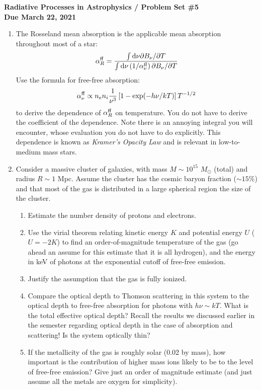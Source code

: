 \documentclass[11pt, preprint]{article}
\begin{document}
\begin{center}
  {\bf Radiative Processes in Astrophysics / Problem Set \#5 \\
    Due March 22, 2021}
\end{center}

\begin{enumerate}
\item 
  The Rosseland mean absorption is the applicable mean absorption
  throughout most of a star:
  \begin{equation}
    \alpha_R^{\rm ff} = \frac{\int {\rm d}\nu \partial B_\nu /
      \partial T}
    {\int {\rm d}\nu \left(1/\alpha_\nu^{\rm ff}\right) \partial B_\nu / \partial T}
  \end{equation}
  Use the formula for free-free absorption:
  \begin{equation}
    \alpha_\nu^{\rm ff} \propto n_e n_i \frac{1}{\nu^3} \left[1 -
      \exp(-h\nu/ kT)\right] T^{-1/2}
  \end{equation}
  to derive the dependence of $\alpha_R^{\rm ff}$ on temperature. You
  do not have to derive the coefficient of the dependence. Note there
  is an annoying integral you will encounter, whose evaluation you do
  not have to do explicitly. This dependence is known as {\it Kramer's
    Opacity Law} and is relevant in low-to-medium mass stars.

\item Consider a massive cluster of galaxies, with mass $M\sim
  10^{15}$ $M_\odot$ (total) and radius $R\sim 1$ Mpc. Assume
  the cluster has the cosmic baryon fraction ($\sim 15\%$) and that
  most of the gas is distributed in a large spherical region the size
  of the cluster.
\begin{enumerate}
  \item Estimate the number density of protons and electrons. 
  \item Use the virial theorem relating kinetic energy $K$ and
    potential energy $U$ ($U = -2K$) to find an order-of-magnitude
    temperature of the gas (go ahead an assume for this estimate that
    it is all hydrogen), and the energy in keV of photons at the
    exponential cutoff of free-free emission.
  \item Justify the assumption that the gas is fully ionized.
  \item Compare the optical depth to Thomson scattering in this system
    to the optical depth to free-free absorption for photons with
    $h\nu \sim kT$. What is the total effective optical depth? Recall
    the results we discussed earlier in the semester regarding optical
    depth in the case of absorption and scattering! Is the system
    optically thin?
  \item If the metallicity of the gas is roughly solar (0.02 by mass),
    how important is the contribution of higher mass ions likely to be
    to the level of free-free emission? Give just an order of
    magnitude estimate (and just assume all the metals are oxygen for
    simplicity).
\end{enumerate}

\end{enumerate}
\end{document}
